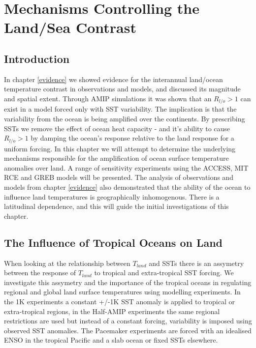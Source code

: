 \chapter{Mechanisms Controlling the Land/Sea Contrast} 

\tableofcontents %

\label{mechanisms} 


\section{Introduction}
In chapter \ref{evidence} we showed evidence for the interannual land/ocean 
temperature contrast in observations and models, and discussed its magnitude and 
spatial extent. Through AMIP simulations it was shown that an $R_{l/o}>1$ can 
exist in a model forced only with SST variability. The implication is that the 
variability from the ocean is being amplified over the continents. By 
prescribing SSTs we remove the effect of ocean heat capacity - and it's ability 
to cause $R_{l/o}>1$ by damping the ocean's response relative to the land 
response for a uniform forcing. In this chapter we will attempt to determine the 
underlying mechanisms responsible for the amplification of ocean surface 
temperature anomalies over land. A range of sensitivity experiments using the 
ACCESS, MIT RCE and GREB models will be presented.  The analysis of observations 
and models from chapter \ref{evidence} also demonstrated that the ability of the 
ocean to influence land temperatures is geographically inhomogenous. There is a  
latitudinal dependence, and this will guide the initial investigations of this 
chapter.


\section{The Influence of Tropical Oceans on Land}

When looking at the relationship between $T_{land}$ and SSTs there is an 
assymetry between the response of $T_{land}$ to tropical and extra-tropical SST 
forcing. We investigate this assymetry and the importance of the tropical oceans 
in regulating regional and global land surface temperatures using modelling 
experiments. In the 1K experiments a constant +/-1K SST anomaly is applied to 
tropical or extra-tropical regions, in the Half-AMIP experiments the same 
regional restrictions are used but instead of a constant forcing, variability is 
imposed using observed SST anomalies. The Pacemaker experiments are forced with 
an idealised ENSO in the tropical Pacific and a slab ocean or fixed SSTs 
elsewhere.

